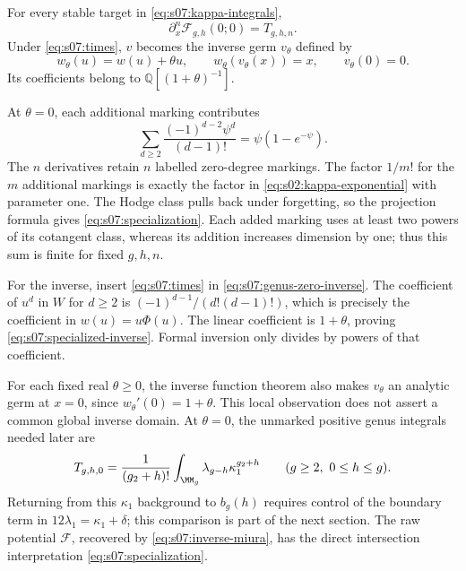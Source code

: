 \begin{prp}\label{prp:s07:specialization}
For every stable target in \eqref{eq:s07:kappa-integrals},
\begin{equation}\label{eq:s07:specialization}
 \partial_x^n\mathcal F_{g,h}(0;0)=T_{g,h,n}.
\end{equation}
Under \eqref{eq:s07:times}, $v$ becomes the inverse germ $v_\theta$
defined by
\begin{equation}\label{eq:s07:specialized-inverse}
 w_\theta(u)=w(u)+\theta u,\qquad
 w_\theta(v_\theta(x))=x,\qquad v_\theta(0)=0.
\end{equation}
Its coefficients belong to $\mathbb Q[(1+\theta)^{-1}]$.
\end{prp}
\begin{prf}
At $\theta=0$, each additional marking contributes
\begin{equation}\label{eq:s07:new-marking}
 \sum_{d\geq2}\frac{(-1)^{d-2}\psi^d}{(d-1)!}
                    =\psi(1-e^{-\psi}).
\end{equation}
The $n$ derivatives retain $n$ labelled zero-degree markings. The
factor $1/m!$ for the $m$ additional markings is exactly the factor
in \eqref{eq:s02:kappa-exponential} with parameter one. The Hodge
class pulls back under forgetting, so the projection formula gives
\eqref{eq:s07:specialization}. Each added marking uses at least
two powers of its cotangent class, whereas its addition increases
dimension by one; thus this sum is finite for fixed $g,h,n$.

For the inverse, insert \eqref{eq:s07:times} in
\eqref{eq:s07:genus-zero-inverse}. The coefficient of $u^d$ in
$W$ for $d\geq2$ is $(-1)^{d-1}/(d!(d-1)!)$, which is precisely
the coefficient in $w(u)=u\Phi(u)$. The linear coefficient is
$1+\theta$, proving \eqref{eq:s07:specialized-inverse}.
Formal inversion only divides by powers of that coefficient.
\end{prf}

For each fixed real $\theta\geq0$, the inverse function theorem
also makes $v_\theta$ an analytic germ at $x=0$, since
$w_\theta'(0)=1+\theta$. This local observation does not assert a
common global inverse domain. At $\theta=0$, the unmarked positive
genus integrals needed later are
\begin{equation}\label{eq:s07:unmarked}
 T_{g,h,0}
 =\frac1{(g_2+h)!}\int_{\MM_g}\lambda_{g-h}\kappa_1^{g_2+h}
       \qquad(g\geq2,\ 0\leq h\leq g).
\end{equation}
Returning from this $\kappa_1$ background to $b_g(h)$ requires control
of the boundary term in $12\lambda_1=\kappa_1+\delta$; this comparison
is part of the next section. The raw potential $\mathcal F$,
recovered by \eqref{eq:s07:inverse-miura}, has the direct intersection
interpretation \eqref{eq:s07:specialization}.
